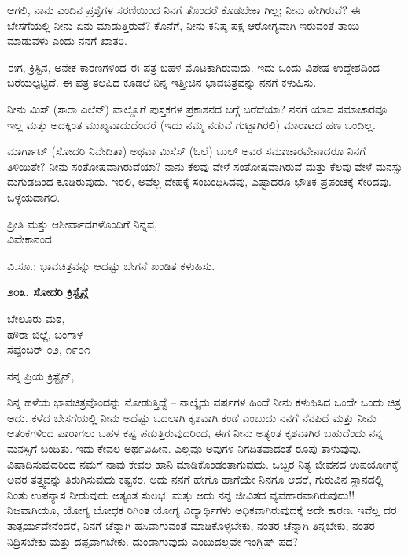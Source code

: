 ಆಗಲಿ, ನಾನು ಎಂದಿನ ಪ್ರಶ್ನೆಗಳ ಸರಣಿಯಿಂದ ನಿನಗೆ ತೊಂದರೆ ಕೊಡಬೇಕಾ ಗಿಲ್ಲ; ನೀನು ಹೇಗಿರುವೆ? ಈ ಬೇಸಗೆಯಲ್ಲಿ ನೀನು ಏನು ಮಾಡುತ್ತಿರುವೆ? ಕೊನೆಗೆ, ನೀನು ಕನಿಷ್ಠ ಪಕ್ಷ ಆರೋಗ್ಯವಾಗಿ ಇರುವಂತೆ ತಾಯಿ ಮಾಡುವಳು ಎಂದು ನನಗೆ ಖಾತರಿ.

ಈಗ, ಕ್ರಿಸ್ಟಿನ, ಅನೇಕ ಕಾರಣಗಳಿಂದ ಈ ಪತ್ರ ಬಹಳ ಮೊಟಕಾಗಿರುವುದು. ಇದು ಒಂದು ವಿಶೇಷ ಉದ್ದೇಶದಿಂದ ಬರೆಯಲ್ಪಟ್ಟಿದೆ. ಈ ಪತ್ರ ತಲಪಿದ ಕೂಡಲೆ ನಿನ್ನ ಇತ್ತೀಚಿನ ಭಾವಚಿತ್ರವನ್ನು ನನಗೆ ಕಳುಹಿಸು.

ನೀನು ಮಿಸ್ (ಸಾರಾ ಎಲೆನ್) ವಾಲ್ಡೊಗೆ ಪುಸ್ತಕಗಳ ಪ್ರಕಾಶನದ ಬಗ್ಗೆ ಬರೆದೆಯಾ? ನನಗೆ ಯಾವ ಸಮಾಚಾರವೂ ಇಲ್ಲ ಮತ್ತು ಅದಕ್ಕಿಂತ ಮುಖ್ಯವಾದುದೆಂದರೆ (ಇದು ನಮ್ಮ ನಡುವೆ ಗುಟ್ಟಾಗಿರಲಿ) ಮಾರಾಟದ ಹಣ ಬಂದಿಲ್ಲ.

ಮಾರ್ಗಾಟ್ (ಸೋದರಿ ನಿವೇದಿತಾ) ಅಥವಾ ಮಿಸೆಸ್ (ಓಲೆ) ಬುಲ್ ಅವರ ಸಮಾಚಾರವೇನಾದರೂ ನಿನಗೆ ತಿಳಿಯಿತೇ? ನೀನು ಸಂತೋಷವಾಗಿರುವೆಯಾ? ನಾನು ಕೆಲವು ವೇಳೆ ಸಂತೋಷವಾಗಿರುವೆ ಮತ್ತು ಕೆಲವು ವೇಳೆ ಮನಸ್ಸು ದುಗುಡದಿಂದ ಕೂಡಿರುವುದು. ಇರಲಿ, ಅವೆಲ್ಲ ದೇಹಕ್ಕೆ ಸಂಬಂಧಿಸಿದವು, ಎಷ್ಟಾದರೂ ಭೌತಿಕ ಪ್ರಪಂಚಕ್ಕೆ ಸೇರಿದವು. ಒಳ್ಳೆಯದಾಗಲಿ.

\begin{flushright}
ಪ್ರೀತಿ ಮತ್ತು ಆಶೀರ್ವಾದಗಳೊಂದಿಗೆ ನಿನ್ನವ,\\ವಿವೇಕಾನಂದ
\end{flushright}

ವಿ.ಸೂ.: ಭಾವಚಿತ್ರವನ್ನು ಆದಷ್ಟು ಬೇಗನೆ ಖಂಡಿತ ಕಳುಹಿಸು.

\begin{center}
\textbf{೨೦೩. ಸೋದರಿ ಕ್ರಿಸ್ಟೈನ್ಗೆ}
\end{center}

\begin{flushright}
ಬೇಲೂರು ಮಠ,\\ಹೌರಾ ಜಿಲ್ಲೆ, ಬಂಗಾಳ\\ಸೆಪ್ಟೆಂಬರ್ ೦೨, ೧೯೦೧
\end{flushright}

ನನ್ನ ಪ್ರಿಯ ಕ್ರಿಸ್ಟೈನ್,

ನಿನ್ನ ಹಳೆಯ ಭಾವಚಿತ್ರವೊಂದನ್ನು ನೋಡುತ್ತಿದ್ದೆ – ನಾಲ್ಕೈದು ವರ್ಷಗಳ ಹಿಂದೆ ನೀನು ಕಳುಹಿಸಿದ ಒಂದೇ ಒಂದು ಚಿತ್ರ ಅದು. ಕಳೆದ ಬೇಸಗೆಯಲ್ಲಿ ನೀನು ಅದೆಷ್ಟು ಬದಲಾಗಿ ಕೃಶವಾಗಿ ಕಂಡೆ ಎಂಬುದು ನನಗೆ ನೆನಪಿದೆ ಮತ್ತು ನೀನು ಆತಂಕಗಳಿಂದ ಪಾರಾಗಲು ಬಹಳ ಕಷ್ಟ ಪಡುತ್ತಿರುವುದರಿಂದ, ಈಗ ನೀನು ಅತ್ಯಂತ ಕೃಶವಾಗಿರ ಬಹುದೆಂದು ನನ್ನ ಮನಸ್ಸಿಗೆ ಬಂದಿತು. ಇದು ಕೇವಲ ಅರ್ಥವಿಹೀನ. ಎಲ್ಲವೂ ಅವುಗಳ ನಿಗದಿತವಾದಂತೆ ರೂಪು ತಾಳುವುವು. ವಿಷಾದಿಸುವುದರಿಂದ ನಮಗೆ ನಾವು ಕೇವಲ ಹಾನಿ ಮಾಡಿಕೊಂಡಂತಾಗುವುದು. ಒಬ್ಬರ ನಿತ್ಯ ಜೀವನದ ಉಪಯೋಗಕ್ಕೆ ಅವರ ತತ್ತ್ವವನ್ನು ತಿರುಗಿಸುವುದು ಕಷ್ಟಕರ. ಅದು ನನಗೆ ಹೇಗೊ ಹಾಗೆಯೇ ನಿನಗೂ ಆದರೆ, ಗುರುವಿನ ಸ್ಥಾನದಲ್ಲಿ ನಿಂತು ಉಪನ್ಯಾಸ ನೀಡುವುದು ಅತ್ಯಂತ ಸುಲಭ. ಮತ್ತು ಅದು ನನ್ನ ಜೀವಿತದ ವ್ಯವಹಾರವಾಗಿರುವುದು!! ನಿಜವಾಗಿಯೂ, ಯೋಗ್ಯ ಬೋಧಕ ರಿಗಿಂತ ಯೋಗ್ಯ ವಿದ್ಯಾರ್ಥಿಗಳು ಅಧಿಕವಾಗಿರುವುದಕ್ಕೆ ಅದೇ ಕಾರಣ. ಇವೆಲ್ಲ ದರ ತಾತ್ಪರ್ಯವೇನೆಂದರೆ, ನಿನಗೆ ಚೆನ್ನಾಗಿ ಹಸಿವಾಗುವಂತೆ ಮಾಡಿಕೊಳ್ಳಬೇಕು, ನಂತರ ಚೆನ್ನಾಗಿ ತಿನ್ನಬೇಕು, ನಂತರ ನಿದ್ರಿಸಬೇಕು ಮತ್ತು ದಪ್ಪವಾಗಬೇಕು. ದುಂಡಾಗುವುದು  ಎಂಬುದಲ್ಲವೇ ಇಂಗ್ಲಿಷ್ ಪದ?

